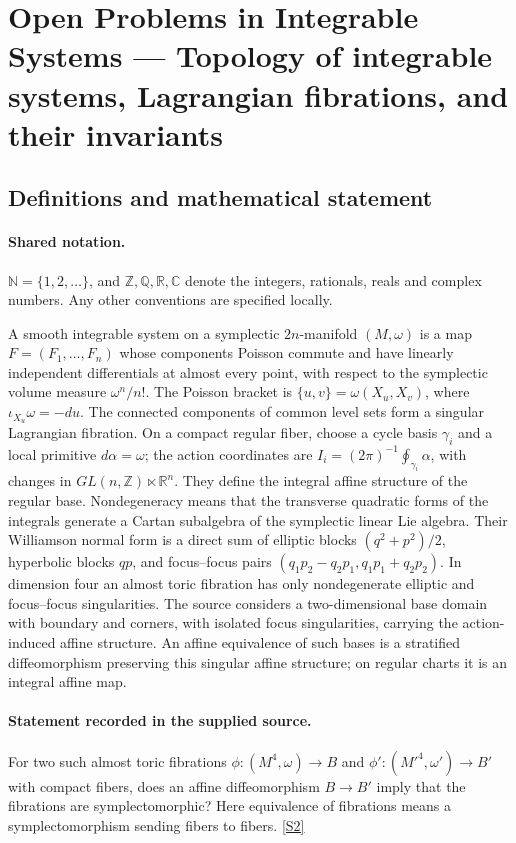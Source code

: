 \documentclass[11pt]{article}
\newcommand{\sref}[2]{\hyperlink{source:#1:#2}{[S#2]}}
\begin{document}
\section{Open Problems in Integrable Systems — Topology of integrable systems, Lagrangian fibrations, and their invariants}\label{statement}

\subsection{Definitions and mathematical statement}

\paragraph{Shared notation.}$\mathbb N=\{1,2,\ldots\}$, and $\mathbb Z,\mathbb Q,\mathbb R,\mathbb C$ denote the integers, rationals, reals and complex numbers. Any other conventions are specified locally.


A smooth integrable system on a symplectic $2n$-manifold $(M,\omega)$ is a map $F=(F_1,\ldots,F_n)$ whose components Poisson commute and have linearly independent differentials at almost every point, with respect to the symplectic volume measure $\omega^n/n!$. The Poisson bracket is $\{u,v\}=\omega(X_u,X_v)$, where $\iota_{X_u}\omega=-du$. The connected components of common level sets form a singular Lagrangian fibration. On a compact regular fiber, choose a cycle basis $\gamma_i$ and a local primitive $d\alpha=\omega$; the action coordinates are $I_i=(2\pi)^{-1}\oint_{\gamma_i}\alpha$, with changes in $GL(n,\mathbb Z)\ltimes\mathbb R^n$. They define the integral affine structure of the regular base. Nondegeneracy means that the transverse quadratic forms of the integrals generate a Cartan subalgebra of the symplectic linear Lie algebra. Their Williamson normal form is a direct sum of elliptic blocks $(q^2+p^2)/2$, hyperbolic blocks $qp$, and focus--focus pairs $(q_1p_2-q_2p_1,q_1p_1+q_2p_2)$. In dimension four an almost toric fibration has only nondegenerate elliptic and focus--focus singularities. The source considers a two-dimensional base domain with boundary and corners, with isolated focus singularities, carrying the action-induced affine structure. An affine equivalence of such bases is a stratified diffeomorphism preserving this singular affine structure; on regular charts it is an integral affine map.
\paragraph{Statement recorded in the supplied source.}
For two such almost toric fibrations $\phi:(M^4,\omega)\to B$ and $\phi':({M'}^4,\omega')\to B'$ with compact fibers, does an affine diffeomorphism $B\to B'$ imply that the fibrations are symplectomorphic? Here equivalence of fibrations means a symplectomorphism sending fibers to fibers. \sref{statement}{2}
\end{document}
